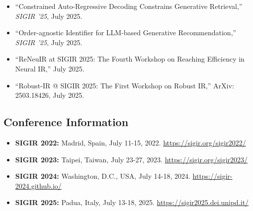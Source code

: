 \documentclass[11pt,letterpaper]{article}
\begin{document}
\begin{itemize}[leftmargin=*]
    \item ``Constrained Auto-Regressive Decoding Constrains Generative Retrieval,'' \textit{SIGIR '25}, July 2025.

    \item ``Order-agnostic Identifier for LLM-based Generative Recommendation,'' \textit{SIGIR '25}, July 2025.

    \item ``ReNeuIR at SIGIR 2025: The Fourth Workshop on Reaching Efficiency in Neural IR,'' July 2025.

    \item ``Robust-IR @ SIGIR 2025: The First Workshop on Robust IR,'' ArXiv: 2503.18426, July 2025.
\end{itemize}

\subsection{Conference Information}

\begin{itemize}[leftmargin=*]
    \item \textbf{SIGIR 2022:} Madrid, Spain, July 11-15, 2022. \url{https://sigir.org/sigir2022/}

    \item \textbf{SIGIR 2023:} Taipei, Taiwan, July 23-27, 2023. \url{https://sigir.org/sigir2023/}

    \item \textbf{SIGIR 2024:} Washington, D.C., USA, July 14-18, 2024. \url{https://sigir-2024.github.io/}

    \item \textbf{SIGIR 2025:} Padua, Italy, July 13-18, 2025. \url{https://sigir2025.dei.unipd.it/}
\end{itemize}
\end{document}
